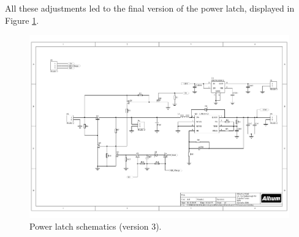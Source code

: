 All these adjustments led to the final version of the power latch, displayed in Figure \ref{development:scematicV3}.
\begin{figure}[ht]
 	\centering
 	\includegraphics[clip, trim=4cm 4cm 1cm 5cm, width=1\textwidth]{4-development/hardware/graphics/PowerLatch/PwrLatch_V3_sch.pdf}
 	\caption{Power latch schematics (version 3).\label{development:scematicV3}}
\end{figure}


